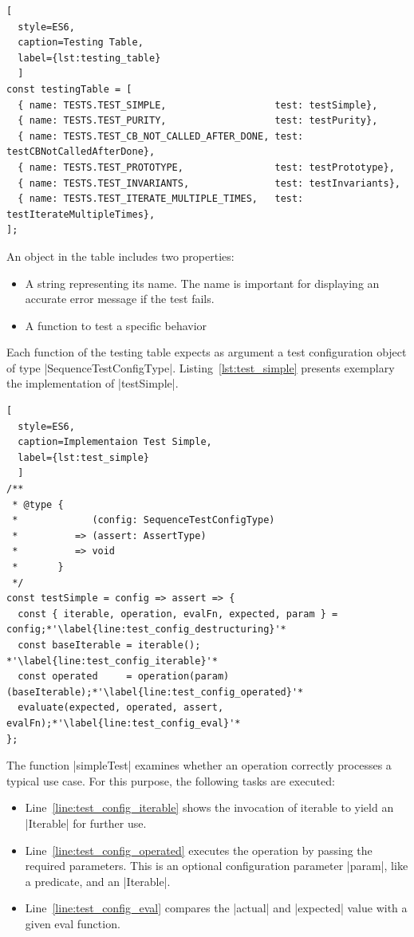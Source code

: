 \begin{lstlisting}[
  style=ES6, 
  caption=Testing Table,
  label={lst:testing_table}
  ]
const testingTable = [
  { name: TESTS.TEST_SIMPLE,                   test: testSimple},
  { name: TESTS.TEST_PURITY,                   test: testPurity},
  { name: TESTS.TEST_CB_NOT_CALLED_AFTER_DONE, test: testCBNotCalledAfterDone},
  { name: TESTS.TEST_PROTOTYPE,                test: testPrototype},
  { name: TESTS.TEST_INVARIANTS,               test: testInvariants},
  { name: TESTS.TEST_ITERATE_MULTIPLE_TIMES,   test: testIterateMultipleTimes},
];
\end{lstlisting}

An object in the table includes two properties:
\begin{itemize}
\item{A string representing its name. The name is important for displaying an accurate error message if the test fails.}
\item{A function to test a specific behavior}
\end{itemize}

Each function of the testing table expects as argument a test configuration
object of type |SequenceTestConfigType|.
Listing~\ref{lst:test_simple} presents exemplary the implementation of |testSimple|.

\begin{lstlisting}[
  style=ES6, 
  caption=Implementaion Test Simple,
  label={lst:test_simple}
  ]
/**
 * @type {
 *             (config: SequenceTestConfigType)
 *          => (assert: AssertType)
 *          => void
 *       }
 */
const testSimple = config => assert => {
  const { iterable, operation, evalFn, expected, param } = config;*'\label{line:test_config_destructuring}'*
  const baseIterable = iterable(); *'\label{line:test_config_iterable}'*
  const operated     = operation(param)(baseIterable);*'\label{line:test_config_operated}'*
  evaluate(expected, operated, assert, evalFn);*'\label{line:test_config_eval}'*
};
\end{lstlisting}

The function |simpleTest| examines whether an operation correctly processes a typical use case.
For this purpose, the following tasks are executed: 
\begin{itemize}
  \item{Line~\ref{line:test_config_iterable} shows the invocation of
    iterable to yield an |Iterable| for further use.}
  \item{Line~\ref{line:test_config_operated} executes the operation by passing
    the required parameters. This is an optional configuration parameter
  |param|, like a predicate, and an |Iterable|.}
  \item{Line~\ref{line:test_config_eval} compares the |actual| and |expected| value with a given eval function. } 
\end{itemize}

